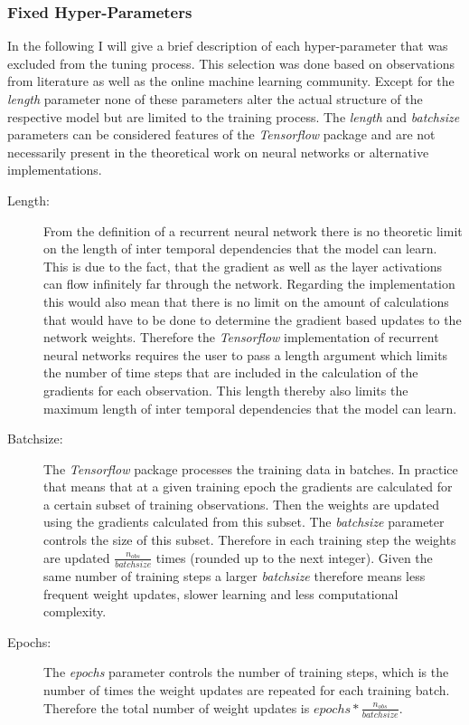 \subsubsection{Fixed Hyper-Parameters}
In the following I will give a brief description of each hyper-parameter that was excluded from the tuning process. This selection was done based on observations from literature as well as the online machine learning community. Except for the \textit{length} parameter none of these parameters alter the actual structure of the respective model but are limited to the training process. The \textit{length} and \textit{batchsize} parameters can be considered features of the \textit{Tensorflow} package and are not necessarily present in the theoretical work on neural networks or alternative implementations.
\begin{description}
\item[Length:] From the definition of a recurrent neural network there is no theoretic limit on the length of inter temporal dependencies that the model can learn. This is due to the fact, that the gradient as well as the layer activations can flow infinitely far through the network. Regarding the implementation this would also mean that there is no limit on the amount of calculations that would have to be done to determine the gradient based updates to the network weights. Therefore the \textit{Tensorflow} implementation of recurrent neural networks requires the user to pass a length argument which limits the number of time steps that are included in the calculation of the gradients for each observation. This length thereby also limits the maximum length of inter temporal dependencies that the model can learn.

\item[Batchsize:] The \textit{Tensorflow} package processes the training data in batches. In practice that means that at a given training epoch the gradients are calculated for a certain subset of training observations. Then the weights are updated using the gradients calculated from this subset. The \textit{batchsize} parameter controls the size of this subset. Therefore in each training step the weights are updated $\frac{n_{obs}}{batchsize}$ times (rounded up to the next integer). Given the same number of training steps a larger \textit{batchsize} therefore means less frequent weight updates, slower learning and less computational complexity.

\item[Epochs:] The \textit{epochs} parameter controls the number of training steps, which is the number of times the weight updates are repeated for each training batch. Therefore the total number of weight updates is $epochs * \frac{n_{obs}}{batchsize}$. 


\end{description}

